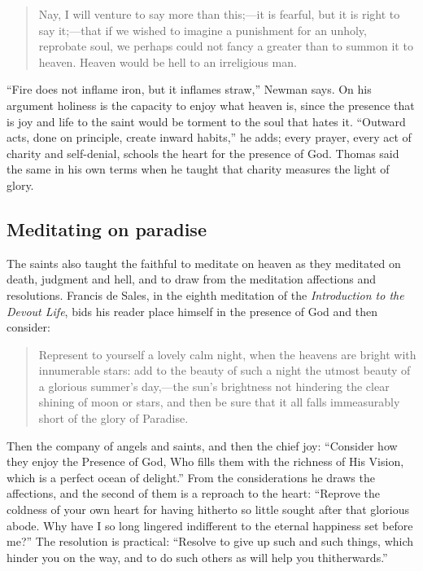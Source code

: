 \begin{quote}
Nay, I will venture to say more than this;---it is fearful, but it is right to say it;---that if we wished to imagine a punishment for an unholy, reprobate soul, we perhaps could not fancy a greater than to summon it to heaven. Heaven would be hell to an irreligious man.
\end{quote}

``Fire does not inflame iron, but it inflames straw,'' Newman says. On his argument holiness is the capacity to enjoy what heaven is, since the presence that is joy and life to the saint would be torment to the soul that hates it. ``Outward acts, done on principle, create inward habits,'' he adds; every prayer, every act of charity and self-denial, schools the heart for the presence of God. Thomas said the same in his own terms when he taught that charity measures the light of glory.

\subsection{Meditating on paradise}

The saints also taught the faithful to meditate on heaven as they meditated on death, judgment and hell, and to draw from the meditation affections and resolutions. Francis de Sales, in the eighth meditation of the \emph{Introduction to the Devout Life}, bids his reader place himself in the presence of God and then consider:

\begin{quote}
Represent to yourself a lovely calm night, when the heavens are bright with innumerable stars: add to the beauty of such a night the utmost beauty of a glorious summer's day,---the sun's brightness not hindering the clear shining of moon or stars, and then be sure that it all falls immeasurably short of the glory of Paradise.
\end{quote}

Then the company of angels and saints, and then the chief joy: ``Consider how they enjoy the Presence of God, Who fills them with the richness of His Vision, which is a perfect ocean of delight.'' From the considerations he draws the affections, and the second of them is a reproach to the heart: ``Reprove the coldness of your own heart for having hitherto so little sought after that glorious abode. Why have I so long lingered indifferent to the eternal happiness set before me?'' The resolution is practical: ``Resolve to give up such and such things, which hinder you on the way, and to do such others as will help you thitherwards.''

